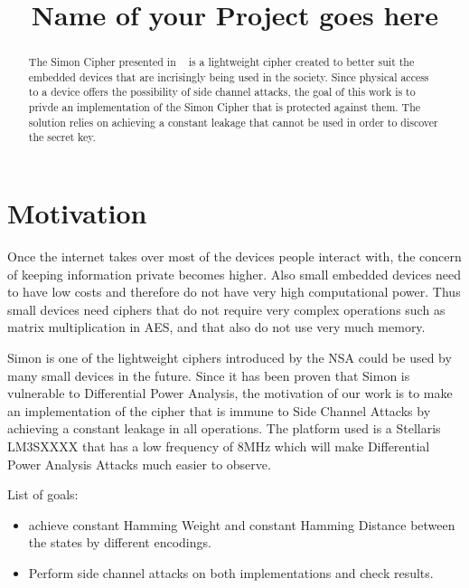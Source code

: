 \documentclass[conference]{IEEEtran}
\begin{document}
\title{Name of your Project goes here}


\author{
}
\maketitle

\begin{abstract}

  The Simon Cipher presented in ~\cite{Beaulieu_Simon} is a lightweight cipher created to better suit the embedded devices that are incrisingly being used in the society. Since physical access to a device offers the possibility of side channel attacks, the goal of this work is to privde an implementation of the Simon Cipher that is protected against them. The solution relies on achieving a constant leakage that cannot be used in order to discover the secret key.

\end{abstract}

\section{Motivation}

Once the internet takes over most of the devices people interact with, the concern of keeping information private becomes higher. Also small embedded devices need to have low costs and therefore do not have very high computational power. Thus small devices need ciphers that do not require very complex operations such as matrix multiplication in AES, and that also do not use very much memory.

Simon is one of the lightweight ciphers introduced by the NSA could be used by many small devices in the future. Since it has been proven that Simon is vulnerable to Differential Power Analysis, the motivation of our work is to make an implementation of the cipher that is immune to Side Channel Attacks by achieving a constant leakage in all operations. The platform used is a Stellaris LM3SXXXX that has a low frequency of 8MHz which will make Differential Power Analysis Attacks much easier to observe. 

List of goals:
\begin{itemize}
        \item achieve constant Hamming Weight and constant Hamming Distance between the states by different encodings.
        \item Perform side channel attacks on both implementations and check results.
\end{itemize}
\end{document}
